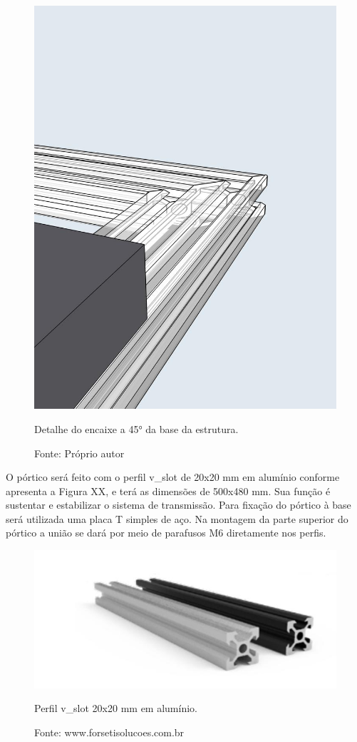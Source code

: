 \begin{figure}[!htb]
\centering
\includegraphics[scale = 1]{figuras/3-6}
\caption{Detalhe do encaixe a 45° da base da estrutura.}
\caption*{Fonte: Próprio autor}
\label{figdetalhe45}
\end{figure}
    
O pórtico será feito com o perfil v\_slot de 20x20 mm em alumínio conforme apresenta a Figura XX, 
e terá as dimensões de 500x480 mm. Sua função é sustentar e estabilizar o sistema de transmissão. 
Para fixação do pórtico à base será utilizada uma placa T simples de aço. Na montagem da parte 
superior do pórtico a união se dará por meio de parafusos M6 diretamente nos perfis.

\begin{figure}[!htb]
\centering
\includegraphics[scale = 1]{figuras/3-7}
\caption{Perfil v\_slot 20x20 mm em alumínio.}
\caption*{Fonte: www.forsetisolucoes.com.br}
\label{figp20x20p}
\end{figure}
    
